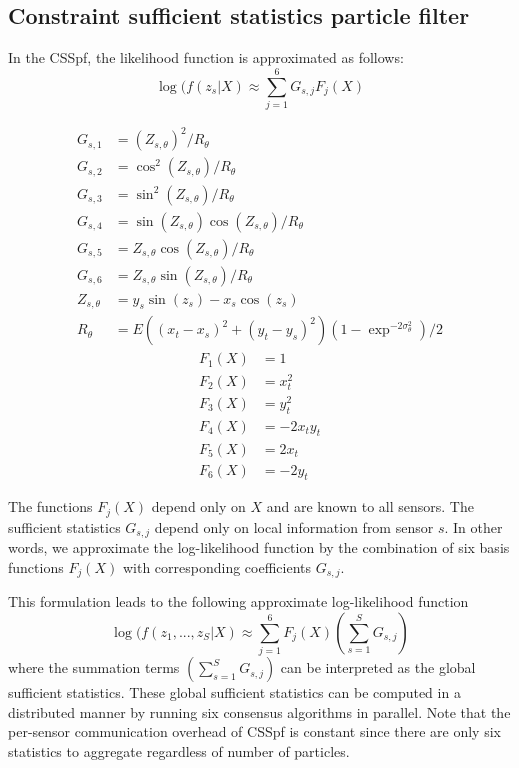 \documentclass[10pt,letterpaper,final]{article}
\begin{document}
\subsection{Constraint sufficient statistics particle filter}
In the CSSpf, the likelihood function is approximated as follows:
\begin{equation}
\log(f(z_s|X) \approx \sum_{j=1}^6 G_{s,j}F_j(X)
\end{equation}
\begin{multicols}{3}
\begin{align*}
G_{s,1} &= (Z_{s,\theta})^2/R_\theta\\
G_{s,2} &= \cos^2(Z_{s,\theta})/R_\theta\\
G_{s,3} &= \sin^2(Z_{s,\theta})/R_\theta\\
G_{s,4} &= \sin(Z_{s,\theta})\cos(Z_{s,\theta})/R_\theta\\
G_{s,5} &= Z_{s,\theta}\cos(Z_{s,\theta})/R_\theta\\
G_{s,6} &= Z_{s,\theta}\sin(Z_{s,\theta})/R_\theta \\
Z_{s,\theta} &= y_s\sin(z_s)-x_s\cos(z_s) \\
R_\theta &= E((x_t-x_s)^2+(y_t-y_s)^2)(1-\exp^{-2\sigma_\theta^2})/2
\end{align*}
\vfill\null
\columnbreak
\begin{align*}
F_1(X) &= 1\\
F_2(X) &= x_t^2 \\
F_3(X) &= y_t^2\\
F_4(X) &= -2x_ty_t\\
F_5(X) &= 2x_t\\
F_6(X) &= -2y_t 
\end{align*}
\end{multicols}

The functions $F_j(X)$ depend only on $X$ and are known to all sensors. The sufficient statistics $G_{s,j}$ depend only on local information from sensor $s$. In other words, we approximate the log-likelihood function by the combination of six basis functions $F_j(X)$ with corresponding coefficients $G_{s,j}$. 

This formulation leads to the following approximate log-likelihood function
\begin{equation}
\log(f(z_1,..., z_S|X) \approx \sum_{j=1}^6 F_j(X) \left(\sum_{s=1}^S G_{s,j}\right)
\label{eqn:llh_css}
\end{equation}
where the summation terms $\left(\sum_{s=1}^S G_{s,j}\right)$ can be interpreted as the global sufficient statistics. These global sufficient statistics can be computed in a distributed manner by running six consensus algorithms in parallel. Note that the per-sensor communication overhead of CSSpf is constant since there are only six statistics to aggregate regardless of number of particles. 
\end{document}
